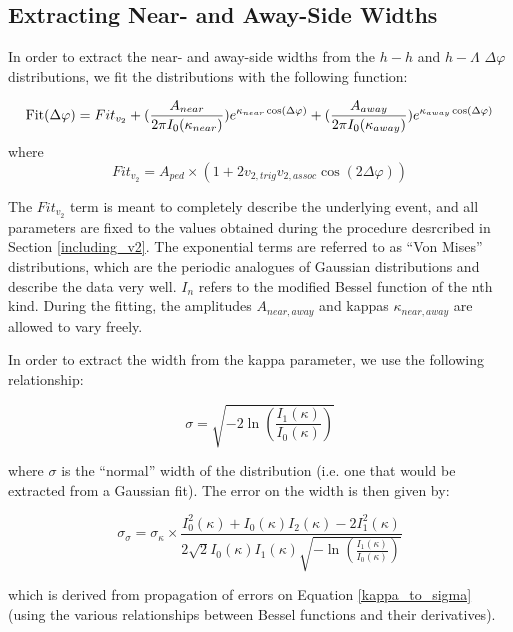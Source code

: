 \documentclass[ALICE,manyauthors]{ALICE_analysis_notes}
\begin{document}
\clearpage

\subsection{Extracting Near- and Away-Side Widths}
\label{width_extraction}
In order to extract the near- and away-side widths from the $h-h$ and $h-\Lambda$ $\Delta\varphi$ distributions, we fit the distributions with the following function:

\begin{equation}
	\text{Fit}(\Delta\varphi) = Fit_{v_{2}} +
	(\frac{A_{near}}{2\pi I_{0}(\kappa_{near})})e^{\kappa_{near} \cos(\Delta\varphi)} +  \\
	(\frac{A_{away}}{2\pi I_{0}(\kappa_{away})})e^{\kappa_{away} \cos(\Delta\varphi)} 
\end{equation}
where 
\begin{equation}
Fit_{v_{2}} = A_{ped}\times(1 + 2v_{2, trig}v_{2, assoc}\cos(2\Delta\varphi))
\end{equation}

The $Fit_{v_{2}}$ term is meant to completely describe the underlying event, and all parameters are fixed to the values obtained during the procedure desrcribed in Section \ref{including_v2}. The exponential terms are referred to as ``Von Mises'' distributions, which are the periodic analogues of Gaussian distributions and describe the data very well. $I_{n}$ refers to the modified Bessel function of the nth kind. During the fitting, the amplitudes $A_{near, away}$ and kappas $\kappa_{near, away}$ are allowed to vary freely. 

In order to extract the width from the kappa parameter, we use the following relationship:

\begin{equation}
\label{kappa_to_sigma}
\sigma = \sqrt{-2\ln(\frac{I_{1}(\kappa)}{I_{0}(\kappa)})}
\end{equation}

where $\sigma$ is the ``normal'' width of the distribution (i.e. one that would be extracted from a Gaussian fit). The error on the width is then given by:

\begin{equation}
\sigma_{\sigma} = \sigma_{\kappa}\times\frac{I_{0}^{2}(\kappa) + I_{0}(\kappa)I_{2}(\kappa) - 2I_{1}^{2}(\kappa)}{2\sqrt{2}I_{0}(\kappa)I_{1}(\kappa)\sqrt{-\ln(\frac{I_{1}(\kappa)}{I_{0}(\kappa)})}}
\end{equation}

which is derived from propagation of errors on Equation \ref{kappa_to_sigma} (using the various relationships between Bessel functions and their derivatives).
\end{document}
